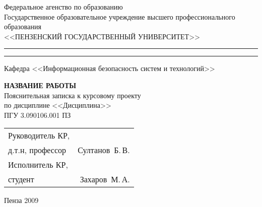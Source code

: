 \newpage
\begin{center}
  \begin{singlespace}
    Федеральное агенство по образованию  \\
    Государственное образовательное учреждение высшего профессионального образования \\
    \vspace{0.25cm}
    <<ПЕНЗЕНСКИЙ ГОСУДАРСТВЕННЫЙ УНИВЕРСИТЕТ>> \\
    \medskip 
    \hrule height 1pt
    \vskip 1pt 
    \hrule
    \vskip 3pt
    Кафедра <<Информационная безопасность систем и технологий>>
  \end{singlespace}

  \vspace{8em}

  \textsc{\textbf{НАЗВАНИЕ РАБОТЫ}}\\[0.5cm]

  Пояснительная записка к курсовому проекту \\
  по дисциплине <<Дисциплина>>\\[0.5cm]

  ПГУ 3.090106.001 ПЗ

  \vspace{8em}

  \begin{tabular}[h]{p{7cm}r}
    Руководитель КР,  & \\
    д.т.н, профессор & \underline{\hspace{3cm}}Султанов~Б.\,В.\\
    Исполнитель КР,  & \\
    студент & \underline{\hspace{3cm}}Захаров~М.\,А.
  \end{tabular}

  \vspace{\fill}

  Пенза 2009 

\end{center}
\newpage
